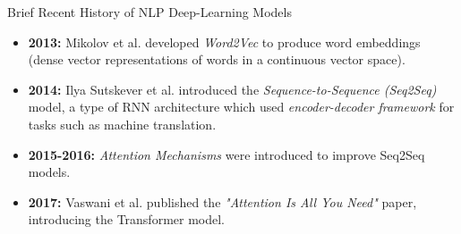 \documentclass[10pt]{beamer}
\begin{document}
\begin{frame}[fragile]{Brief Recent History of NLP Deep-Learning Models}
	\begin{itemize}

		\item \textbf{2013:} Mikolov et al. developed \textit{Word2Vec} to produce word embeddings (dense vector
		      representations of words in a continuous vector space).


		\item \textbf{2014:} Ilya Sutskever et al. introduced the \textit{Sequence-to-Sequence (Seq2Seq)} model,
		      a type of RNN architecture which used \textit{encoder-decoder framework} for tasks such as
		      machine translation.


		\item \textbf{2015-2016:} \textit{Attention Mechanisms} were introduced to improve Seq2Seq models.


		\item \textbf{2017:} Vaswani et al. published the \textit{"Attention Is All You Need"} paper, introducing
		      the Transformer model.



	\end{itemize}
\end{frame}
\end{document}
